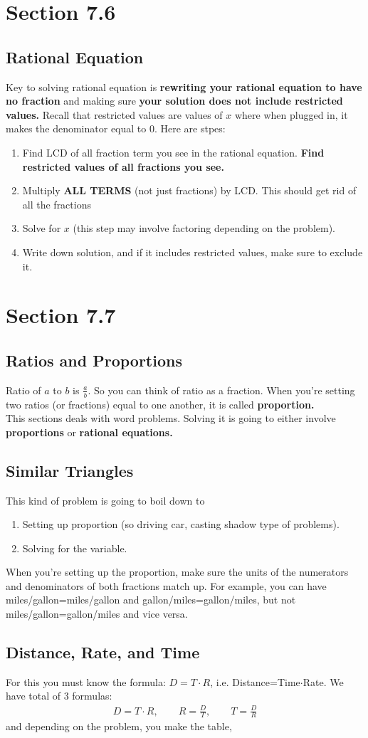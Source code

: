 \documentclass[11pt]{article}
\theoremstyle{plain}
\theoremstyle{definition}
\theoremstyle{remark}
\begin{document}
\section{Section 7.6}
\subsection{Rational Equation}
Key to solving rational equation is \textbf{rewriting your rational equation to have no fraction} and making sure \textbf{your solution does not include restricted values.} Recall that restricted values are values of $x$ where when plugged in, it makes the denominator equal to $0.$ Here are stpes: 
\begin{enumerate}[1)]
\item Find LCD of all fraction term you see in the rational equation. \textbf{Find restricted values of all fractions you see.}
\item Multiply \textbf{ALL TERMS} (not just fractions) by LCD. This should get rid of all the fractions 
\item Solve for $x$ (this step may involve factoring depending on the problem). 
\item Write down solution, and if it includes restricted values, make sure to exclude it.
\end{enumerate}
\section{Section 7.7}
\subsection{Ratios and Proportions}
Ratio of $a$ to $b$ is $\frac{a}{b}.$ So you can think of ratio as a fraction. When you're setting two ratios (or fractions) equal to one another, it is called \textbf{proportion.}\\ 

\noindent This sections deals with word problems. Solving it is going to either involve \textbf{proportions} or \textbf{rational equations.} 
\subsection{Similar Triangles}
This kind of problem is going to boil down to
\begin{enumerate}[1)]
\item Setting up proportion (so driving car, casting shadow type of problems).
\item Solving for the variable.
\end{enumerate}
When you're setting up the proportion, make sure the units of the numerators and denominators of both fractions match up. For example, you can have miles/gallon=miles/gallon and gallon/miles=gallon/miles, but not miles/gallon=gallon/miles and vice versa. 
\subsection{Distance, Rate, and Time}
For this you must know the formula: $D=T\cdot R$, i.e. Distance=Time$\cdot$Rate. We have total of 3 formulas: 
\begin{align*}
D=T\cdot R, \hspace{2em} R=\frac{D}{T}, \hspace{2em} T=\frac{D}{R}  
\end{align*}
and depending on the problem, you make the table, 
\end{document}

